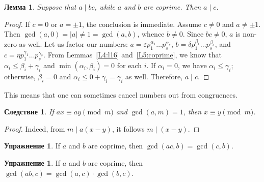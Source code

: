 \documentclass[12pt,notitlepage]{article}
\theoremstyle{plain}
\newtheorem{lemma}[thm]{Лемма}
\newtheorem{corr}[thm]{Следствие}
\theoremstyle{definition}
\newtheorem{exc}[thm]{Упражнение}
\theoremstyle{plain}
\newcommand{\eps}{\varepsilon}
\newcommand{\1}{\mathbf{1}}
\newcommand{\0}{\mathbf{0}}
\newcommand{\dvd}{\mathop{\mid}}
\begin{document}

\begin{lemma}\label{L5:l2}
	Suppose that $a \dvd b c$, while $a$ and $b$ are coprime. Then $a \dvd c$.
\end{lemma}
\begin{proof}
	If $c = 0$ or $a =  \pm 1$, the conclusion is immediate. Assume $c \neq 0$ and $a \neq \pm 1$. Then $\gcd(a,0) = |a| \neq 1 = \gcd(a,b)$, whence $b \neq 0$. Since $bc \neq 0$, $a$ is non-zero as well. Let us factor our numbers: $a = \eps p^{\alpha_1}_1\ldots p^{\alpha_s}_s$, $b = \delta p^{\beta_1}_1\ldots p^{\beta_s}_s$, and $c = \eta p^{\gamma_1}_1\ldots p^{\gamma_s}_s$. From Lemmas~\ref{L4:l16} and~\ref{L5:coprime}, we know that $\alpha_i \leq \beta_i + \gamma_i$ and $\min(\alpha_i, \beta_i) = 0$ for each $i$. If $\alpha_i = 0$, we have $\alpha_i \leq \gamma_i$; otherwise, $\beta_i = 0$ and $\alpha_i \leq 0 + \gamma_i = \gamma_i$ as well. Therefore, $a \dvd c$.
\end{proof}
\noindent This means that one can sometimes cancel numbers out from congruences.
\begin{corr}\label{L5:c_cancel}
	If $a x \equiv a y \pmod m$ and $\gcd(a, m) = 1$, then $x \equiv y \pmod m$.
\end{corr}
\begin{proof}
	Indeed, from $m \dvd a(x - y)$,  it follows $m \dvd (x - y)$.
\end{proof}

\begin{exc}\label{L5:gcd_copirme1}
	If $a$ and $b$ are coprime, then $\gcd(ac, b) = \gcd(c, b)$.
\end{exc}

\begin{exc}\label{L5:gcd_copirme2}
	If $a$ and $b$ are coprime, then $\gcd(ab, c) = \gcd(a,c) \cdot \gcd(b,c)$.
\end{exc}
\end{document}
